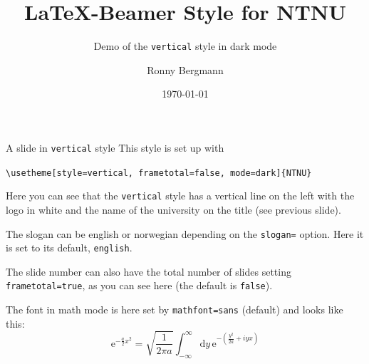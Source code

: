\documentclass[aspectratio=169]{beamer}
\title{\LaTeX{}-Beamer Style for NTNU}
\subtitle{Demo of the  \texttt{vertical} style in dark mode}
\author{Ronny Bergmann}
\date{\today}
\begin{document}
	\maketitle
		\begin{frame}[fragile]{A slide in \texttt{vertical} style}
			This style is set up with

			\lstinline!\usetheme[style=vertical, frametotal=false, mode=dark]{NTNU}!

			Here you can see that the \texttt{vertical} style has a vertical line on the left with the logo in white and the name of the university on the title (see previous slide).

			The slogan can be english or norwegian depending on the \lstinline!slogan=! option. Here it is set to its default, \lstinline!english!.

			The slide number can also have the total number of slides setting \lstinline!frametotal=true!,
            as you can see here (the default is \lstinline!false!).

            The font in math mode is here set by \lstinline!mathfont=sans! (default) and looks like this: \[\mathrm{e}^{-\frac{a}{2}x^2} = \sqrt{\frac{1}{2\pi a}} \int_{-\infty}^\infty\mathrm{d}y\, \mathrm{e}^{-\left(\frac{y^2}{2a} +iy x\right)}\]
		\end{frame}
\end{document}
